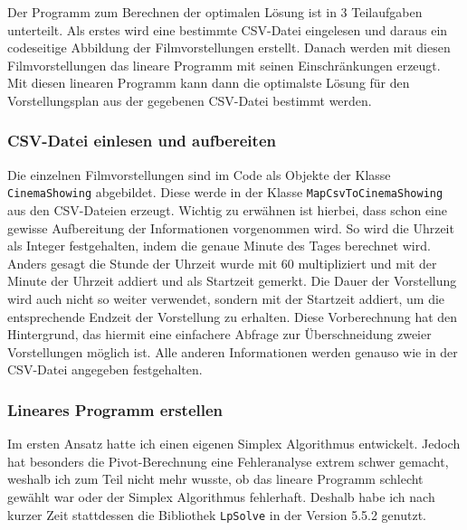 \documentclass[a4paper, 12pt]{article}
\begin{document}
Der Programm zum Berechnen der optimalen Lösung ist in 3 Teilaufgaben unterteilt. 
Als erstes wird eine bestimmte CSV-Datei eingelesen und daraus ein codeseitige Abbildung der Filmvorstellungen erstellt.
Danach werden mit diesen Filmvorstellungen das lineare Programm mit seinen Einschränkungen erzeugt.
Mit diesen linearen Programm kann dann die optimalste Lösung für den Vorstellungsplan aus der gegebenen CSV-Datei bestimmt werden.

\subsubsection{CSV-Datei einlesen und aufbereiten}

Die einzelnen Filmvorstellungen sind im Code als Objekte der Klasse \linebreak \texttt{CinemaShowing} abgebildet.
Diese werde in der Klasse  \linebreak \texttt{MapCsvToCinemaShowing} aus den CSV-Dateien erzeugt.
Wichtig zu erwähnen ist hierbei, dass schon eine gewisse Aufbereitung der Informationen vorgenommen wird.
So wird die Uhrzeit als Integer festgehalten, indem die genaue Minute des Tages berechnet wird. 
Anders gesagt die Stunde der Uhrzeit wurde mit 60 multipliziert und mit der Minute der Uhrzeit addiert und als Startzeit gemerkt.
Die Dauer der Vorstellung wird auch nicht so weiter verwendet, sondern mit der Startzeit addiert, um die entsprechende Endzeit der Vorstellung zu erhalten.
Diese Vorberechnung hat den Hintergrund, das hiermit eine einfachere Abfrage zur Überschneidung zweier Vorstellungen möglich ist.
Alle anderen Informationen werden genauso wie in der CSV-Datei angegeben festgehalten.

\subsubsection{Lineares Programm erstellen}

Im ersten Ansatz hatte ich einen eigenen Simplex Algorithmus entwickelt.
Jedoch hat besonders die Pivot-Berechnung eine Fehleranalyse extrem schwer gemacht, weshalb ich zum Teil nicht mehr wusste, ob das lineare Programm schlecht gewählt war oder der Simplex Algorithmus fehlerhaft.
Deshalb habe ich nach kurzer Zeit stattdessen die Bibliothek \texttt{LpSolve} in der Version 5.5.2 genutzt.
\end{document}
